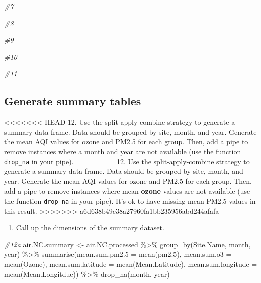 \documentclass[
]{article}
\newenvironment{Shaded}{\begin{snugshade}}{\end{snugshade}}
\newcommand{\AttributeTok}[1]{\textcolor[rgb]{0.77,0.63,0.00}{#1}}
\newcommand{\CommentTok}[1]{\textcolor[rgb]{0.56,0.35,0.01}{\textit{#1}}}
\newcommand{\FloatTok}[1]{\textcolor[rgb]{0.00,0.00,0.81}{#1}}
\newcommand{\FunctionTok}[1]{\textcolor[rgb]{0.00,0.00,0.00}{#1}}
\newcommand{\NormalTok}[1]{#1}
\newcommand{\OtherTok}[1]{\textcolor[rgb]{0.56,0.35,0.01}{#1}}
\newcommand{\SpecialCharTok}[1]{\textcolor[rgb]{0.00,0.00,0.00}{#1}}
\providecommand{\tightlist}{%
  \setlength{\itemsep}{0pt}\setlength{\parskip}{0pt}}
\begin{document}
\begin{Shaded}
\begin{Highlighting}[]
\CommentTok{\#7 }
  
\CommentTok{\#8 }

\CommentTok{\#9}

\CommentTok{\#10}

\CommentTok{\#11}
\end{Highlighting}
\end{Shaded}

\hypertarget{generate-summary-tables}{%
\subsection{Generate summary tables}\label{generate-summary-tables}}

\textless\textless\textless\textless\textless\textless\textless{} HEAD
12. Use the split-apply-combine strategy to generate a summary data
frame. Data should be grouped by site, month, and year. Generate the
mean AQI values for ozone and PM2.5 for each group. Then, add a pipe to
remove instances where a month and year are not available (use the
function \texttt{drop\_na} in your pipe). ======= 12. Use the
split-apply-combine strategy to generate a summary data frame. Data
should be grouped by site, month, and year. Generate the mean AQI values
for ozone and PM2.5 for each group. Then, add a pipe to remove instances
where mean \textbf{ozone} values are not available (use the function
\texttt{drop\_na} in your pipe). It's ok to have missing mean PM2.5
values in this result.
\textgreater\textgreater\textgreater\textgreater\textgreater\textgreater\textgreater{}
a6d638b49c38a27960fa1bb235956abd244afafa

\begin{enumerate}
\def\labelenumi{\arabic{enumi}.}
\setcounter{enumi}{12}
\tightlist
\item
  Call up the dimensions of the summary dataset.
\end{enumerate}

\begin{Shaded}
\begin{Highlighting}[]
\CommentTok{\#12a}
\NormalTok{air.NC.summary }\OtherTok{\textless{}{-}}\NormalTok{ air.NC.processed }\SpecialCharTok{\%\textgreater{}\%}
  \FunctionTok{group\_by}\NormalTok{(Site.Name, month, year) }\SpecialCharTok{\%\textgreater{}\%} 
  \FunctionTok{summarise}\NormalTok{(}\AttributeTok{mean.sum.pm2.5 =} \FunctionTok{mean}\NormalTok{(pm2}\FloatTok{.5}\NormalTok{),}
            \AttributeTok{mean.sum.o3 =} \FunctionTok{mean}\NormalTok{(Ozone),}
            \AttributeTok{mean.sum.latitude =} \FunctionTok{mean}\NormalTok{(Mean.Latitude),}
            \AttributeTok{mean.sum.longitude =} \FunctionTok{mean}\NormalTok{(Mean.Longitdue)) }\SpecialCharTok{\%\textgreater{}\%} 
  \FunctionTok{drop\_na}\NormalTok{(month, year)}
\end{Highlighting}
\end{Shaded}
\end{document}
